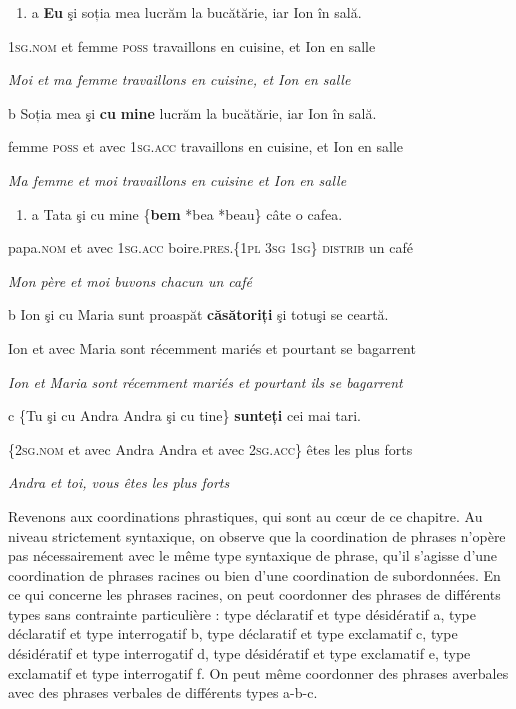 \begin{enumerate}
\item \label{bkm:Ref272395209}a  \textbf{Eu } şi  soția  mea  lucrăm  la  bucătărie,  iar  Ion  în  sală.


\end{enumerate}
\textsc{  1sg.nom}\textsc{ } et  femme  \textsc{poss } travaillons  en  cuisine,  et  Ion  en  salle

  \textit{Moi et ma femme travaillons en cuisine, et Ion en salle}

b  Soția  mea  şi  \textbf{cu}  \textbf{mine}  lucrăm  la  bucătărie,  iar  Ion  în  sală.

  femme  \textsc{poss}  et  avec  1\textsc{sg.acc } travaillons  en  cuisine,  et  Ion  en  salle

  \textit{Ma femme et moi travaillons en cuisine et Ion en salle}


\begin{enumerate}
\item \label{bkm:Ref272401966}a  Tata  şi  cu  mine  \{\textbf{bem} {\textbar} *bea {\textbar} *beau\}  câte  o  cafea.


\end{enumerate}
  papa.\textsc{nom}  et  avec  1\textsc{sg.acc } boire.\textsc{pres.\{1pl {\textbar} 3sg {\textbar} 1sg}\}  \textsc{distrib}  un  café

  \textit{Mon père et moi buvons chacun un café}

b  Ion  şi  cu  Maria  sunt  proaspăt  \textbf{căsătoriți}  şi  totuşi  se  ceartă.

  Ion  et  avec  Maria  sont  récemment  mariés  et  pourtant  se  bagarrent

  \textit{Ion et Maria sont récemment mariés et pourtant ils se bagarrent}  

c  \{Tu  şi  cu  Andra {\textbar} Andra  şi  cu  tine\}  \textbf{sunteți}  cei  mai  tari.

  \{2\textsc{sg.nom}  et  avec  Andra {\textbar} Andra  et  avec  2\textsc{sg.acc\} } êtes  les  plus  forts

  \textit{Andra et toi, vous êtes les plus forts}

Revenons aux coordinations phrastiques, qui sont au c{\oe}ur de ce chapitre. Au niveau strictement syntaxique, on observe que la coordination de phrases n'opère pas nécessairement avec le même type syntaxique de phrase, qu'il s'agisse d'une coordination de phrases racines ou bien d'une coordination de subordonnées. En ce qui concerne les phrases racines, on peut coordonner des phrases de différents types sans contrainte particulière : type déclaratif et type désidératif a, type déclaratif et type interrogatif b, type déclaratif et type exclamatif c, type désidératif et type interrogatif d, type désidératif et type exclamatif e, type exclamatif et type interrogatif f. On peut même coordonner des phrases averbales avec des phrases verbales de différents types a-b-c.


